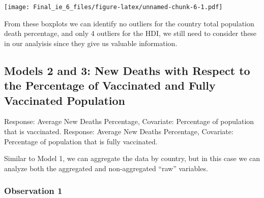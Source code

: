 \documentclass[
  12pt,
]{article}
\newenvironment{Shaded}{\begin{snugshade}}{\end{snugshade}}
\newcommand{\AttributeTok}[1]{\textcolor[rgb]{0.77,0.63,0.00}{#1}}
\newcommand{\FunctionTok}[1]{\textcolor[rgb]{0.00,0.00,0.00}{#1}}
\newcommand{\NormalTok}[1]{#1}
\newcommand{\OtherTok}[1]{\textcolor[rgb]{0.56,0.35,0.01}{#1}}
\newcommand{\SpecialCharTok}[1]{\textcolor[rgb]{0.00,0.00,0.00}{#1}}
\begin{document}
\texttt{[image: Final\_ie\_6\_files/figure-latex/unnamed-chunk-6-1.pdf]}

From these boxplots we can identify no outliers for the country total
population death percentage, and only 4 outliers for the HDI, we still
need to consider these in our analyisis since they give us valuable
information.

\hypertarget{models-2-and-3-new-deaths-with-respect-to-the-percentage-of-vaccinated-and-fully-vaccinated-population}{%
\subsection{Models 2 and 3: New Deaths with Respect to the Percentage of
Vaccinated and Fully Vaccinated
Population}\label{models-2-and-3-new-deaths-with-respect-to-the-percentage-of-vaccinated-and-fully-vaccinated-population}}

Response: Average New Deaths Percentage, Covariate: Percentage of
population that is vaccinated. Response: Average New Deaths Percentage,
Covariate: Percentage of population that is fully vaccinated.

Similar to Model 1, we can aggregate the data by country, but in this
case we can analyze both the aggregated and non-aggregated ``raw''
variables.

\begin{Shaded}
\end{Shaded}

\hypertarget{observation-1}{%
\subsubsection{Observation 1}\label{observation-1}}
\end{document}
